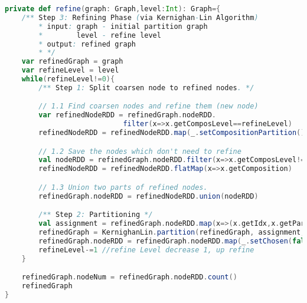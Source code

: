 \begin{lstlisting}[language=Scala]
private def refine(graph: Graph,level:Int): Graph={
    /** Step 3: Refining Phase (via Kernighan-Lin Algorithm)
        * input: graph - initial partition graph
        *        level - refine level
        * output: refined graph
        * */
    var refinedGraph = graph
    var refineLevel = level
    while(refineLevel!=0){
        /** Step 1: Split coarsen node to refined nodes. */

        // 1.1 Find coarsen nodes and refine them (new node)
        var refinedNodeRDD = refinedGraph.nodeRDD.
                            filter(x=>x.getComposLevel==refineLevel)
        refinedNodeRDD = refinedNodeRDD.map(_.setCompositionPartition())

        // 1.2 Save the nodes which don't need to refine
        val nodeRDD = refinedGraph.nodeRDD.filter(x=>x.getComposLevel!=refineLevel)
        refinedNodeRDD = refinedNodeRDD.flatMap(x=>x.getComposition)

        // 1.3 Union two parts of refined nodes.
        refinedGraph.nodeRDD = refinedNodeRDD.union(nodeRDD)

        /** Step 2: Partitioning */
        val assignment = refinedGraph.nodeRDD.map(x=>(x.getIdx,x.getPartition))
        refinedGraph = KernighanLin.partition(refinedGraph, assignment, needMaxGain = true)
        refinedGraph.nodeRDD = refinedGraph.nodeRDD.map(_.setChosen(false))
        refineLevel-=1 //refine Level decrease 1, up refine
    }

    refinedGraph.nodeNum = refinedGraph.nodeRDD.count()
    refinedGraph
}
\end{lstlisting}

